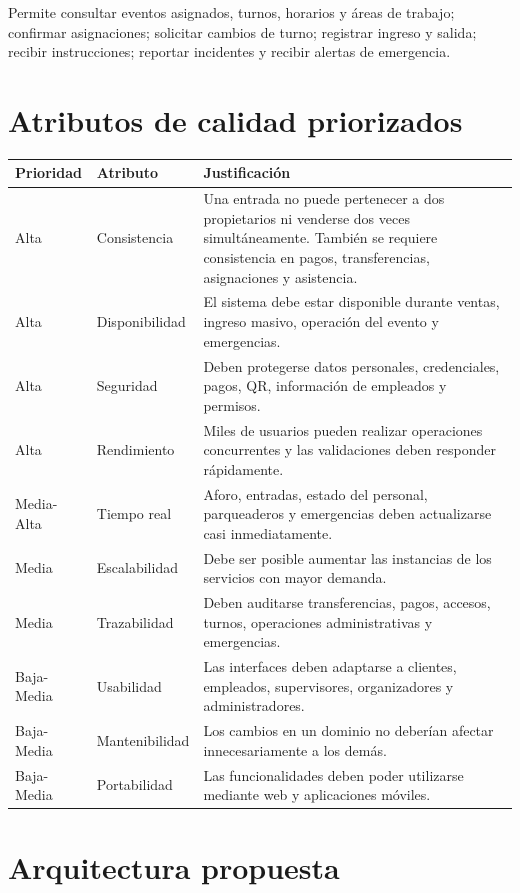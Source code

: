 \documentclass[12pt,a4paper]{article}
\begin{document}
Permite consultar eventos asignados, turnos, horarios y áreas de trabajo; confirmar asignaciones; solicitar cambios de turno; registrar ingreso y salida; recibir instrucciones; reportar incidentes y recibir alertas de emergencia.

\section{Atributos de calidad priorizados}

\begin{longtable}{p{2cm}p{3cm}p{9cm}}
\toprule
\textbf{Prioridad} & \textbf{Atributo} & \textbf{Justificación}\\
\midrule
Alta & Consistencia & Una entrada no puede pertenecer a dos propietarios ni venderse dos veces simultáneamente. También se requiere consistencia en pagos, transferencias, asignaciones y asistencia.\\
Alta & Disponibilidad & El sistema debe estar disponible durante ventas, ingreso masivo, operación del evento y emergencias.\\
Alta & Seguridad & Deben protegerse datos personales, credenciales, pagos, QR, información de empleados y permisos.\\
Alta & Rendimiento & Miles de usuarios pueden realizar operaciones concurrentes y las validaciones deben responder rápidamente.\\
Media-Alta & Tiempo real & Aforo, entradas, estado del personal, parqueaderos y emergencias deben actualizarse casi inmediatamente.\\
Media & Escalabilidad & Debe ser posible aumentar las instancias de los servicios con mayor demanda.\\
Media & Trazabilidad & Deben auditarse transferencias, pagos, accesos, turnos, operaciones administrativas y emergencias.\\
Baja-Media & Usabilidad & Las interfaces deben adaptarse a clientes, empleados, supervisores, organizadores y administradores.\\
Baja-Media & Mantenibilidad & Los cambios en un dominio no deberían afectar innecesariamente a los demás.\\
Baja-Media & Portabilidad & Las funcionalidades deben poder utilizarse mediante web y aplicaciones móviles.\\
\bottomrule
\end{longtable}

\section{Arquitectura propuesta}
\end{document}
